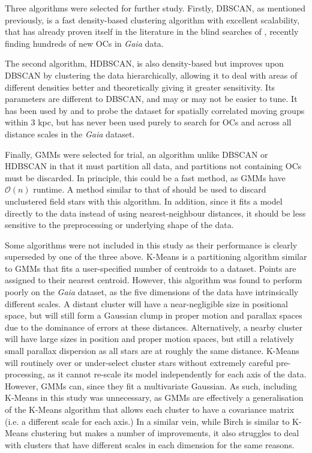 Three algorithms were selected for further study. Firstly, DBSCAN, as mentioned previously, is a fast density-based clustering algorithm with excellent scalability, that has already proven itself in the literature in the blind searches of \cite{castro-ginard_new_2018, castro-ginard_hunting_2019, castro-ginard_hunting_2020}, recently finding hundreds of new OCs in \emph{Gaia} data. 

The second algorithm, HDBSCAN, is also density-based but improves upon DBSCAN by clustering the data hierarchically, allowing it to deal with areas of different densities better and theoretically giving it greater sensitivity. Its parameters are different to DBSCAN, and may or may not be easier to tune. It has been used by \cite{kounkel_untangling_2019} and \cite{kounkel_untangling_2020} to probe the \emph{} dataset for spatially correlated moving groups within 3 kpc, but has never been used purely to search for OCs and across all distance scales in the \emph{Gaia} dataset.

Finally, GMMs were selected for trial, an algorithm unlike DBSCAN or HDBSCAN in that it must partition all data, and partitions not containing OCs must be discarded. In principle, this could be a fast method, as GMMs have $\mathcal{O} ( n )$ runtime. A method similar to that of \cite{cantat-gaudin_gaia_2019} should be used to discard unclustered field stars with this algorithm. In addition, since it fits a model directly to the data instead of using nearest-neighbour distances, it should be less sensitive to the preprocessing or underlying shape of the data.

Some algorithms were not included in this study as their performance is clearly superseded by one of the three above. K-Means \citep{macqueen_methods_1967} is a partitioning algorithm similar to GMMs that fits a user-specified number of centroids to a dataset. Points are assigned to their nearest centroid. However, this algorithm was found to perform poorly on the \emph{Gaia} dataset, as the five dimensions of the data have intrinsically different scales. A distant cluster will have a near-negligible size in positional space, but will still form a Gaussian clump in proper motion and parallax spaces due to the dominance of \emph{} errors at these distances. Alternatively, a nearby cluster will have large sizes in position and proper motion spaces, but still a relatively small parallax dispersion as all stars are at roughly the same distance. K-Means will routinely over or under-select cluster stars without extremely careful pre-processing, as it cannot re-scale its model independently for each axis of the data. However, GMMs can, since they fit a multivariate Gaussian. As such, including K-Means in this study was unnecessary, as GMMs are effectively a generalisation of the K-Means algorithm that allows each cluster to have a covariance matrix (i.e. a different scale for each axis.) In a similar vein, while Birch \citep{zhang_birch_1996} is similar to K-Means clustering but makes a number of improvements, it also struggles to deal with clusters that have different scales in each dimension for the same reasons.


